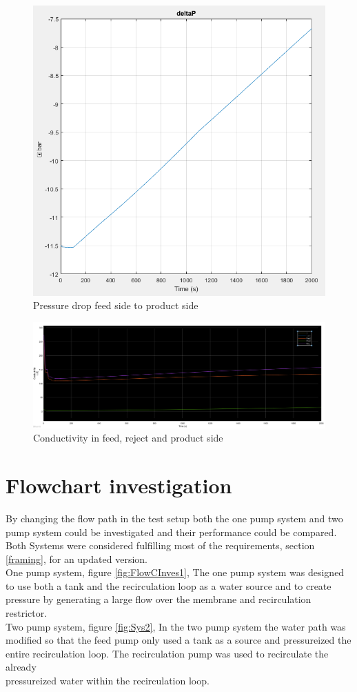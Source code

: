 \begin{figure}[h]
  \centering
  \includegraphics[width=0.5\linewidth]{deltap.PNG}
  \caption{Pressure drop feed side to product side}
  \label{fig:deltap}
\end{figure}
\begin{figure}[h]
\raggedleft
  \includegraphics[width=1.1\linewidth]{cond.PNG}
  \caption{Conductivity in feed, reject and product side}
  \label{fig:cond}
\end{figure}

\newpage


\section{Flowchart investigation}
By changing the flow path in the test setup both the one pump system and two pump system could be investigated and their performance could be compared. Both Systems were considered fulfilling most of the requirements, section \ref{framing}, for an updated version. \\

One pump system, figure \ref{fig:FlowCInves1}, The one pump system was designed to use both a tank and the recirculation loop as a water source and to create pressure by generating a large flow over the membrane and recirculation restrictor. \\


Two pump system, figure \ref{fig:Sys2}, In the two pump system the water path was modified so that the feed pump only used a tank as a source and pressureized the entire recirculation loop. The recirculation pump was used to recirculate the already\\ pressureized water within the recirculation loop.\\



